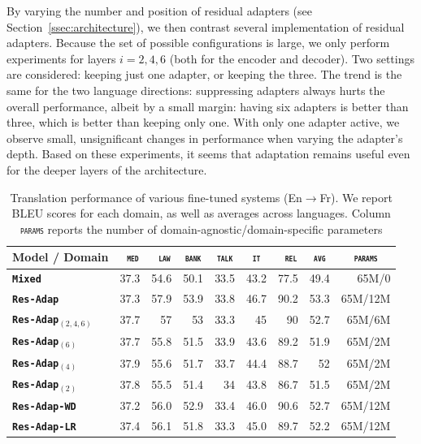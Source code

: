 \documentclass[11pt,a4paper]{article}
\newcommand{\fyDone}[1]{\done[FY]\Todo[FY:]{\textcolor{orange}{#1}}}
\newcommand{\fyFuture}[1]{\done[FY]\Todo[FY:]{\textcolor{red}{#1}}}
\newcommand{\domain}[1]{\texttt{\textsc{#1}}}
\newcommand{\system}[1]{\texttt{\textbf{#1}}}
\begin{document}
By varying the number and position of residual adapters (see Section~\ref{ssec:architecture}), we then contrast several implementation of residual adapters. \fyDone{Fix style here} Because the set of possible configurations is large, we only perform experiments for layers $i= 2, 4, 6$ (both for the encoder and decoder). Two settings are considered: keeping just one adapter, or keeping the three. The trend is the same for the two language directions: suppressing adapters always hurts the overall performance, albeit by a small margin: having six adapters is better than three, which is better than keeping only one. With only one adapter active, we observe small, unsignificant changes in performance when varying the adapter's depth. Based on these experiments, it seems that adaptation remains useful even for the deeper layers of the architecture.\fyFuture{More configurations ?}

\begin{table}[htbp]
  \centering
  \begin{tabular}{|p{3cm}|*{8}{r|}} \hline
    Model / Domain & \multicolumn{1}{c|}{\domain{ med}} & \multicolumn{1}{c|}{\domain{ law}} & \multicolumn{1}{c|}{\domain{bank}} & \multicolumn{1}{c|}{\domain{talk}} & \multicolumn{1}{c|}{\domain{ it }} & \multicolumn{1}{c|}{\domain{ rel}} & \multicolumn{1}{c|}{\domain{avg}} & \multicolumn{1}{c|}{\domain{params}} \\ \hline 
    \system{Mixed}  & 37.3 & 54.6 & 50.1 & 33.5 & 43.2 & 77.5  & 49.4 & 65M/0 \\
    \system{Res-Adap}     & 37.3 & 57.9 & 53.9 & 33.8 & 46.7 & 90.2 & 53.3 & 65M/12M\\ \hline
    \system{Res-Adap$_{(2,4,6)}$}     & 37.7 & 57 & 53 & 33.3 & 45 & 90 & 52.7 & 65M/6M\\
    \system{Res-Adap$_{(6)}$}     & 37.7 & 55.8 & 51.5 & 33.9 & 43.6 & 89.2 & 51.9 & 65M/2M \\
    \system{Res-Adap$_{(4)}$}     & 37.9 & 55.6 & 51.7 & 33.7 & 44.4 & 88.7 & 52 & 65M/2M\\
    \system{Res-Adap$_{(2)}$}     & 37.8 & 55.5 & 51.4 & 34 & 43.8 & 86.7 & 51.5 & 65M/2M\\ \hline
    \system{Res-Adap-WD}     & 37.2 & 56.0 & 52.9 & 33.4 & 46.0 & 90.6 & 52.7 & 65M/12M \\
    \system{Res-Adap-LR}      & 37.4 & 56.1 & 51.8 & 33.3 & 45.0 & 89.7 & 52.2 & 65M/12M \\  
     \hline
  \end{tabular}
  \caption{Translation performance of various fine-tuned systems (En$\rightarrow$Fr). We report BLEU scores for each domain, as well as averages across languages. Column \domain{params} reports the number of domain-agnostic/domain-specific parameters \label{tab:performance-en-fr-pos-reg}} \fyDone{Boldface ?}
\end{table}
\end{document}
